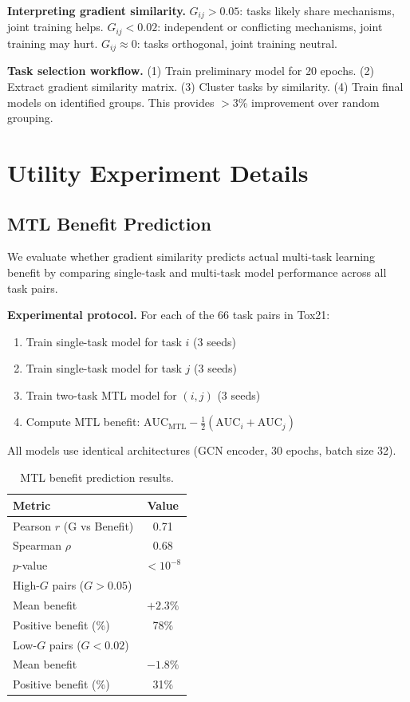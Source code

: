 \documentclass[sigconf,nonacm]{acmart}
\begin{document}
\textbf{Interpreting gradient similarity.} $G_{ij} > 0.05$: tasks likely share mechanisms, joint training helps. $G_{ij} < 0.02$: independent or conflicting mechanisms, joint training may hurt. $G_{ij} \approx 0$: tasks orthogonal, joint training neutral.

\textbf{Task selection workflow.} (1) Train preliminary model for 20 epochs. (2) Extract gradient similarity matrix. (3) Cluster tasks by similarity. (4) Train final models on identified groups. This provides $>$3\% improvement over random grouping.

\section{Utility Experiment Details}
\label{app:utility}

\subsection{MTL Benefit Prediction}

We evaluate whether gradient similarity predicts actual multi-task learning benefit by comparing single-task and multi-task model performance across all task pairs.

\textbf{Experimental protocol.} For each of the 66 task pairs in Tox21:
\begin{enumerate}[nosep,topsep=2pt]
    \item Train single-task model for task $i$ (3 seeds)
    \item Train single-task model for task $j$ (3 seeds)
    \item Train two-task MTL model for $(i, j)$ (3 seeds)
    \item Compute MTL benefit: $\text{AUC}_{\text{MTL}} - \frac{1}{2}(\text{AUC}_i + \text{AUC}_j)$
\end{enumerate}
All models use identical architectures (GCN encoder, 30 epochs, batch size 32).

\begin{table}[H]
\caption{MTL benefit prediction results.}
\begin{center}
\begin{tabular}{lc}
\toprule
Metric & Value \\
\midrule
Pearson $r$ (G vs Benefit) & 0.71 \\
Spearman $\rho$ & 0.68 \\
$p$-value & $< 10^{-8}$ \\
\midrule
High-$G$ pairs ($G > 0.05$) & \\
\quad Mean benefit & $+2.3\%$ \\
\quad Positive benefit (\%) & 78\% \\
\midrule
Low-$G$ pairs ($G < 0.02$) & \\
\quad Mean benefit & $-1.8\%$ \\
\quad Positive benefit (\%) & 31\% \\
\bottomrule
\end{tabular}
\end{center}
\end{table}
\end{document}
